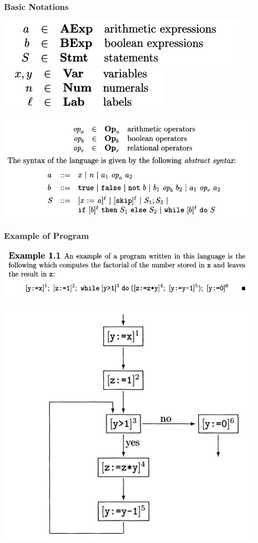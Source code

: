 \documentclass[aspectratio=1610, 13pt]{beamer}
\begin{document}
\begin{frame}\frametitle{Basic Notations}
\begin{center}
\includegraphics[scale=0.4]{not1.png}
\includegraphics[scale=0.4]{not2.png}

\includegraphics[scale=0.4]{not3.png}
\end{center}
\end{frame}

\begin{frame}\frametitle{Example of Program}
\begin{center}
\includegraphics[scale=0.4]{prog_example1.png}

\includegraphics[scale=0.3]{proc_flowgraph.png}
\end{center}
\end{frame}
\end{document}
